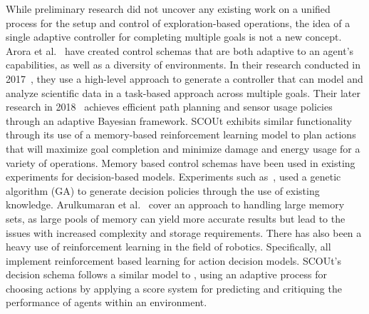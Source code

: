While preliminary research did not uncover any existing work on a unified process for the setup and control of exploration-based operations, the idea of a single adaptive controller for completing multiple goals is not a new concept.
Arora et al.~\cite{arora_approach_2017, hutter_online_2018} have created control schemas that are both adaptive to an agent's capabilities, as well as a diversity of environments.
In their research conducted in 2017~\cite{arora_approach_2017}, they use a high-level approach to generate a controller that can model and analyze scientific data in a task-based approach across multiple goals.
Their later research in 2018~\cite{hutter_online_2018} achieves efficient path planning and sensor usage policies through an adaptive Bayesian framework.
SCOUt exhibits similar functionality through its use of a memory-based reinforcement learning model to plan actions that will maximize goal completion and minimize damage and energy usage for a variety of operations.
Memory based control schemas have been used in existing experiments for decision-based models.
Experiments such as~\cite{fu_genetic_2003, yi_new_2011}, used a genetic algorithm (GA) to generate decision policies through the use of existing knowledge.
Arulkumaran et al.~\cite{arulkumaran_brief_2017} cover an approach to handling large memory sets, as large pools of memory can yield more accurate results but lead to the issues with increased complexity and storage requirements.
There has also been a heavy use of reinforcement learning in the field of robotics.
Specifically, \cite{arulkumaran_brief_2017, bai_toward_2017, kiumarsi_optimal_2018} all implement reinforcement based learning for action decision models.
SCOUt's decision schema follows a similar model to \cite{kiumarsi_optimal_2018}, using an adaptive process for choosing actions by applying a score system for predicting and critiquing the performance of agents within an environment.

